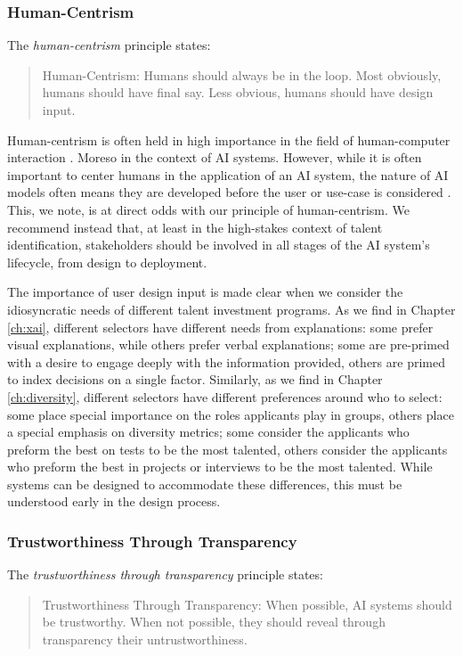 \subsubsection{Human-Centrism}
The \emph{human-centrism} principle states:

\begin{quote}
    Human-Centrism: Humans should always be in the loop. Most obviously, humans should have final say. Less obvious, humans should have design input.
\end{quote}

Human-centrism is often held in high importance in the field of human-computer interaction \cite{citation needed}. Moreso in the context of AI systems. However, while it is often important to center humans in the application of an AI system, the nature of AI models often means they are developed before the user or use-case is considered \cite{citation needed}. This, we note, is at direct odds with our principle of human-centrism. We recommend instead that, at least in the high-stakes context of talent identification, stakeholders should be involved in all stages of the AI system's lifecycle, from design to deployment.

The importance of user design input is made clear when we consider the idiosyncratic needs of different talent investment programs. As we find in Chapter \ref{ch:xai}, different selectors have different needs from explanations: some prefer visual explanations, while others prefer verbal explanations; some are pre-primed with a desire to engage deeply with the information provided, others are primed to index decisions on a single factor. Similarly, as we find in Chapter \ref{ch:diversity}, different selectors have different preferences around who to select: some place special importance on the roles applicants play in groups, others place a special emphasis on diversity metrics; some consider the applicants who preform the best on tests to be the most talented, others consider the applicants who preform the best in projects or interviews to be the most talented. While systems can be designed to accommodate these differences, this must be understood early in the design process.

\subsubsection{Trustworthiness Through Transparency}
The \emph{trustworthiness through transparency} principle states:

\begin{quote}
    Trustworthiness Through Transparency: When possible, AI systems should be trustworthy. When not possible, they should reveal through transparency their untrustworthiness.
\end{quote}


